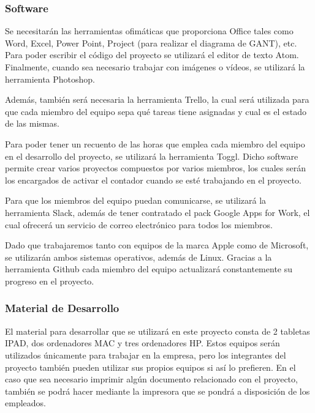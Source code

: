 \subsubsection{Software}
\par{Se necesitarán las herramientas ofimáticas que proporciona Office tales como Word, Excel, Power Point, Project (para realizar el diagrama de GANT), etc. Para poder escribir el código del proyecto se utilizará el editor de texto Atom. Finalmente, cuando sea necesario trabajar con imágenes o vídeos, se utilizará la herramienta Photoshop.}
\par{Además, también será necesaria la herramienta Trello, la cual será utilizada para que cada miembro del equipo sepa qué tareas tiene asignadas y cual es el estado  de las mismas. }
\par{Para poder tener un recuento de las horas que emplea cada miembro del equipo en el desarrollo del proyecto, se utilizará la herramienta Toggl. Dicho software permite crear varios proyectos compuestos por varios miembros, los cuales serán los encargados de activar el contador cuando se esté trabajando en el proyecto.}
\par{Para que los miembros del equipo puedan comunicarse, se utilizará la herramienta Slack, además de tener contratado el pack Google Apps for Work, el cual ofrecerá un servicio de correo electrónico para todos los miembros. }
\par{Dado que trabajaremos tanto con equipos de la marca Apple como de Microsoft, se utilizarán ambos sistemas operativos, además de Linux. Gracias a la herramienta Github cada miembro del equipo actualizará constantemente su progreso en el proyecto.}

\subsubsection{Material de Desarrollo}
\par El material para desarrollar que se utilizará en este proyecto consta de 2 tabletas IPAD, dos ordenadores MAC y tres ordenadores HP. Estos equipos serán utilizados únicamente para trabajar en la empresa, pero los integrantes del proyecto también pueden utilizar sus propios equipos si así lo prefieren. En el caso que sea necesario imprimir algún documento relacionado con el proyecto, también se podrá hacer mediante la impresora que se pondrá a disposición de los empleados.
